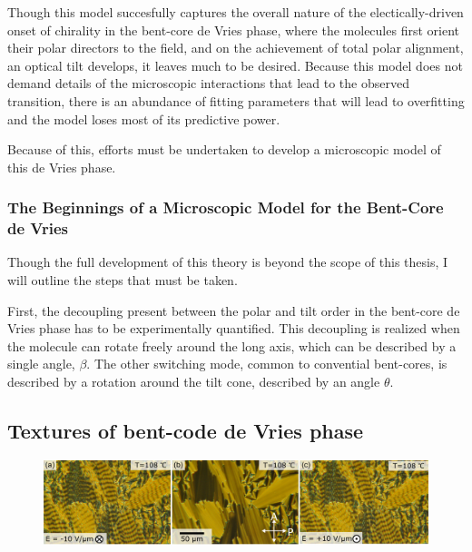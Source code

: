 \documentclass[aagreenthesis]{subfiles}
\begin{document}
Though this model succesfully captures the overall nature of the
electically-driven onset of chirality in the bent-core de Vries phase, where the
molecules first orient their polar directors to the field, and on the
achievement of total polar alignment, an optical tilt develops, it leaves much
to be desired. Because this model does not demand details of the
microscopic interactions that lead to the observed transition, there is an abundance of
fitting parameters that will lead to overfitting and the model loses most of its
predictive power.

Because of this, efforts must be undertaken to develop a microscopic model of
this de Vries phase. 


\subsubsection{The Beginnings of a Microscopic Model for the Bent-Core de Vries}

Though the full development of this theory is beyond the
scope of this thesis, I will outline the steps that must be taken.

First, the decoupling present between the polar and tilt order in the bent-core
de Vries phase has to be experimentally
quantified. This decoupling is realized when the molecule can rotate freely
around the long axis, which can be described by a single angle, $\beta$. The other switching mode, common to convential bent-cores,
is described by a rotation around the tilt cone, described by an angle $\theta$.



\subsection{Textures of bent-code de Vries phase}


\begin{figure}[h!]
    \centering
    \includegraphics[width=.8\textwidth]{figs/pal30/textureSM2/sm1Textures100.png}
    \caption{\label{}}
\end{figure}
\end{document}
